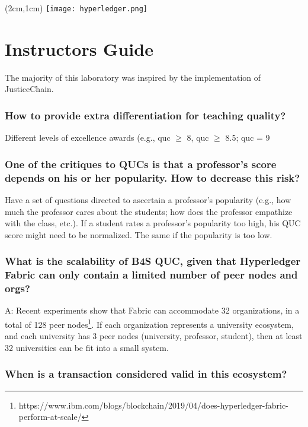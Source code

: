 \documentclass[12pt,a4paper]{article}
\begin{document}
\textblockorigin{-34pt}{-12pt}
\begin{textblock*}{10cm}(2cm,1cm)
\texttt{[image: hyperledger.png]}
\end{textblock*}

\section*{Instructors Guide}


The majority of this laboratory was inspired by the implementation of JusticeChain\cite{belchior2019_audits}.

\subsubsection*{How to provide extra differentiation for teaching quality?}

Different levels of excellence awards (e.g., quc $\geq$ 8, quc $\geq$ 8.5; quc = 9

\subsubsection*{One of the critiques to QUCs is that a professor's score depends on his or her popularity. How to decrease this risk?}

Have a set of questions directed to ascertain a professor's popularity (e.g., how much the professor cares about the students; how does the professor empathize with the class, etc.). If a student rates a professor's popularity too high, his QUC score might need to be normalized. The same if the popularity is too low.

\subsubsection*{What is the scalability of B4S QUC, given that Hyperledger Fabric can only contain a limited number of peer nodes and orgs?}

A: Recent experiments show that Fabric can accommodate 32 organizations, in a total of 128 peer nodes\footnote{https://www.ibm.com/blogs/blockchain/2019/04/does-hyperledger-fabric-perform-at-scale/}. If each organization represents a university ecosystem, and each university has 3 peer nodes (university, professor, student), then at least 32 universities can be fit into a small system.

\subsubsection*{When is a transaction considered valid in this ecosystem?}
\end{document}
